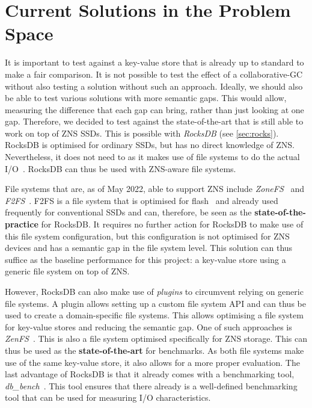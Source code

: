 \section{Current Solutions in the Problem Space}
It is important to test against a key-value store that is already up to standard to make a fair comparison. It is not possible to test the effect of a collaborative-GC without also testing a solution without such an approach. Ideally, we should also be able to test various solutions with more semantic gaps. This would allow, measuring the difference that each gap can bring, rather than just looking at one gap. Therefore, we decided to test against the state-of-the-art that is still able to work on top of ZNS SSDs. This is possible with \textit{RocksDB} (see \autoref{sec:rocks}). RocksDB is optimised for ordinary SSDs, but has no direct knowledge of ZNS. Nevertheless, it does not need to as it makes use of file systems to do the actual I/O~\cite{bjorling2021zns}. RocksDB can thus be used with ZNS-aware file systems.

File systems that are, as of May 2022, able to support ZNS include \textit{ZoneFS}~\cite{le2020zonefs} and \textit{F2FS}~\cite{tehrany2022understanding}. F2FS is a file system that is optimised for flash~\cite{lee2015f2fs} and already used frequently for conventional SSDs and can, therefore, be seen as the \textbf{state-of-the-practice} for RocksDB. It requires no further action for RocksDB to make use of this file system configuration, but this configuration is not optimised for ZNS devices and has a semantic gap in the file system level. This solution can thus suffice as the baseline performance for this project: a key-value store using a generic file system on top of ZNS. 

However, RocksDB can also make use of \textit{plugins} to circumvent relying on generic file systems. A plugin allows setting up a custom file system API and can thus be used to create a domain-specific file systems. This allows optimising a file system for key-value stores and reducing the semantic gap. One of such approaches is \textit{ZenFS}~\cite{bjorling2021zns}. This is also a file system optimised specifically for ZNS storage. This can thus be used as the \textbf{state-of-the-art} for benchmarks. As both file systems make use of the same key-value store, it also allows for a more proper evaluation. The last advantage of RocksDB is that it already comes with a benchmarking tool, \textit{db\_bench}~\cite{cao2020characterizing}. This tool ensures that there already is a well-defined benchmarking tool that can be used for measuring I/O characteristics. 

